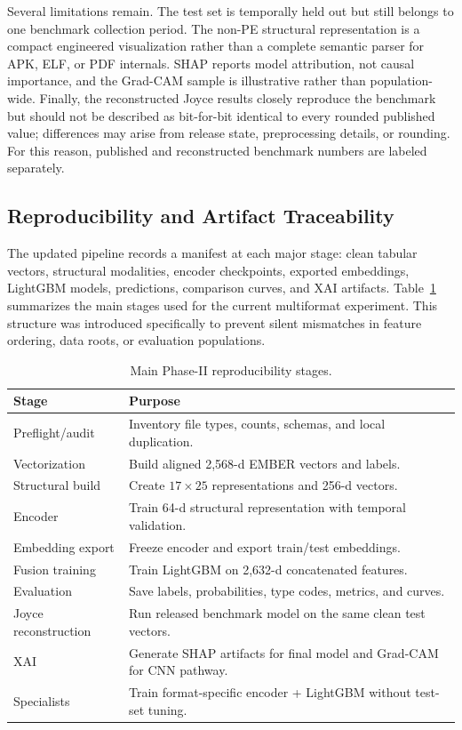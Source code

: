 \documentclass[conference]{IEEEtran}
\begin{document}
Several limitations remain. The test set is temporally held out but still belongs to one benchmark collection period. The non-PE structural representation is a compact engineered visualization rather than a complete semantic parser for APK, ELF, or PDF internals. SHAP reports model attribution, not causal importance, and the Grad-CAM sample is illustrative rather than population-wide. Finally, the reconstructed Joyce results closely reproduce the benchmark but should not be described as bit-for-bit identical to every rounded published value; differences may arise from release state, preprocessing details, or rounding. For this reason, published and reconstructed benchmark numbers are labeled separately.

\subsection{Reproducibility and Artifact Traceability}
The updated pipeline records a manifest at each major stage: clean tabular vectors, structural modalities, encoder checkpoints, exported embeddings, LightGBM models, predictions, comparison curves, and XAI artifacts. Table~\ref{tab:artifact_stages} summarizes the main stages used for the current multiformat experiment. This structure was introduced specifically to prevent silent mismatches in feature ordering, data roots, or evaluation populations.

\begin{table}[t]
\centering
\caption{Main Phase-II reproducibility stages.}
\label{tab:artifact_stages}
\scriptsize
\begin{tabular}{lp{5.2cm}}
\toprule
\textbf{Stage} & \textbf{Purpose} \\
\midrule
Preflight/audit & Inventory file types, counts, schemas, and local duplication. \\
Vectorization & Build aligned 2,568-d EMBER vectors and labels. \\
Structural build & Create $17\times25$ representations and 256-d vectors. \\
Encoder & Train 64-d structural representation with temporal validation. \\
Embedding export & Freeze encoder and export train/test embeddings. \\
Fusion training & Train LightGBM on 2,632-d concatenated features. \\
Evaluation & Save labels, probabilities, type codes, metrics, and curves. \\
Joyce reconstruction & Run released benchmark model on the same clean test vectors. \\
XAI & Generate SHAP artifacts for final model and Grad-CAM for CNN pathway. \\
Specialists & Train format-specific encoder + LightGBM without test-set tuning. \\
\bottomrule
\end{tabular}
\end{table}
\end{document}
